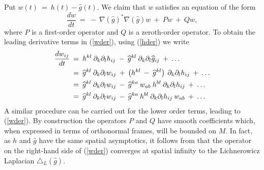 Put $w(t) \: = \: h(t) - \widehat{g}(t)$. We claim that
$w$ satisfies an equation of the form
\begin{equation} \label{wder}
\frac{dw}{dt} \: = \: - \: \nabla(\widehat{g})^* \nabla(\widehat{g}) w
\: + \: Pw \: + \: Qw,
\end{equation}
where $P$ is a first-order operator and $Q$ is a zeroth-order
operator. To obtain the leading derivative terms in (\ref{wder}),
using (\ref{hder}) we write
\begin{align}
\frac{dw_{ij}}{dt} \: & = \: h^{kl} \: \partial_k \partial_l h_{ij} \: - \:
\widehat{g}^{kl} \: \partial_k \partial_l \widehat{g}_{ij} \: + \: \ldots \\
& = \:
\widehat{g}^{kl} \: \partial_k \partial_l w_{ij} \: + \:
\left( h^{kl} \: - \: \widehat{g}^{kl} \right) \:
\partial_k \partial_l h_{ij} \: + \: \ldots \notag \\
& = \:
\widehat{g}^{kl} \: \partial_k \partial_l w_{ij} \: - \:
\widehat{g}^{ka} \: w_{ab} \: h^{bl} \:
\partial_k \partial_l h_{ij} \: + \: \ldots \notag \\
& = \:
\widehat{g}^{kl} \: \partial_k \partial_l w_{ij} \: - \:
\widehat{g}^{ka} \: h^{bl} \:
\partial_k \partial_l h_{ij} \: w_{ab} \: + \: \ldots \notag
\end{align}
A similar procedure can be carried out for the lower order terms,
leading to (\ref{wder}). By construction the operators $P$ and $Q$
have smooth coefficients which, when expressed in terms of orthonormal frames,
will be bounded on $M$. In fact, as
$h$ and $\widehat{g}$
have the same spatial asymptotics, it follows from
\cite[Proposition 4]{Anderson-Chow} that
the operator on the right-hand side of (\ref{wder}) converges at
spatial infinity to
the Lichnerowicz Laplacian $\triangle_L(\widehat{g})$.

